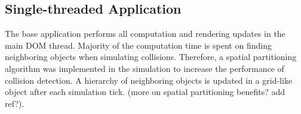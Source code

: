\documentclass[conference]{IEEEtran}
\begin{document}


\subsection{Single-threaded Application}
\label{sec:single}

The base application performs all computation and rendering updates in the main DOM thread. Majority of the computation time is spent on finding neighboring objects when simulating collisions. Therefore, a spatial partitioning algorithm was implemented in the simulation to increase the performance of collision detection. A hierarchy of neighboring objects is updated in a grid-like object after each simulation tick. (more on spatial partitioning benefits? add ref?).




\end{document}
